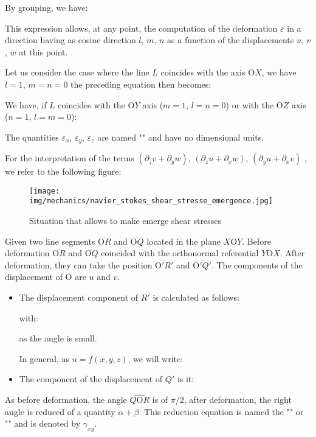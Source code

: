 	By grouping, we have:
	
	This expression allows, at any point, the computation of the deformation $\varepsilon$ in a direction having as cosine direction $l$, $m$, $n$ as a function of the displacements $u$, $v$, $w$ at this point.

	Let us consider the case where the line $L$ coincides with the axis O$X$, we have $l=1$, $m=n=0$ the preceding equation then becomes:
	
	We have, if $L$ coincides with the O$Y$ axis ($m=1$, $l=n=0$) or with the O$Z$ axis ($n=1$, $l=m=0$):
	
	The quantities $\varepsilon_x$, $\varepsilon_y$, $\varepsilon_z$  are named "" and have no dimensional units.

	For the interpretation of the terms $(\partial_z v+\partial_y w)$, $(\partial_z u+\partial_x w)$, $(\partial_y u+\partial_x v)$ , we refer to the following figure:
	\begin{figure}[H]
		\centering
		\texttt{[image: img/mechanics/navier\_stokes\_shear\_stresse\_emergence.jpg]}
		\caption[]{Situation that allows to make emerge shear stresses}
	\end{figure}
	Given two line segments $\overline{\text{O}R}$ and $\overline{\text{O}Q}$ located in the plane $X$O$Y$. Before deformation $\overline{\text{O}R}$ and $\overline{\text{O}Q}$ coincided with the orthonormal referential $Y$O$X$. After deformation, they can take the position $\overline{\text{O}'R'}$ and $\overline{\text{O}'Q'}$. The components of the displacement of O are $u$ and $v$.

	\begin{itemize}
		\item The displacement component of $R'$ is calculated as follows:
		
		with:
		
		as the angle is small.

		In general, as $u=f(x,y,z)$, we will write:
		

		\item The component of the displacement of $Q'$ is it:
		
	\end{itemize}
	As before deformation, the angle $\widehat{Q\text{O}R}$ is of $\pi/2$, after deformation, the right angle is reduced of a quantity $\alpha+\beta$. This reduction equation is named the "" or "" and is denoted by $\gamma_{xy}$.

